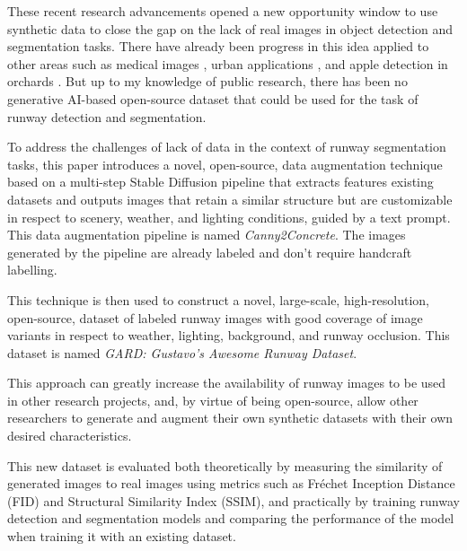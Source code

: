 These recent research advancements opened a new opportunity window to use synthetic data to close the gap on the lack of real images in object detection and segmentation tasks. There have already been progress in this idea applied to other areas such as medical images \cite{saragih_using_2024}, urban applications \cite{reutov_generating_2023}, and apple detection in orchards \cite{voetman_big_2023}. But up to my knowledge of public research, there has been no generative AI-based open-source dataset that could be used for the task of runway detection and segmentation.

To address the challenges of lack of data in the context of runway segmentation tasks, this paper introduces a novel, open-source, data augmentation technique based on a multi-step Stable Diffusion pipeline that extracts features existing datasets and outputs images that retain a similar structure but are customizable in respect to scenery, weather, and lighting conditions, guided by a text prompt. This data augmentation pipeline is named \emph{Canny2Concrete}. The images generated by the pipeline are already labeled and don't require handcraft labelling.

This technique is then used to construct a novel, large-scale, high-resolution, open-source, dataset of labeled runway images with good coverage of image variants in respect to weather, lighting, background, and runway occlusion. This dataset is named \emph{GARD: Gustavo's Awesome Runway Dataset}.

This approach can greatly increase the availability of runway images to be used in other research projects, and, by virtue of being open-source, allow other researchers to generate and augment their own synthetic datasets with their own desired characteristics.

This new dataset is evaluated both theoretically by measuring the similarity of generated images to real images using metrics such as Fréchet Inception Distance (FID) and Structural Similarity Index (SSIM), and practically by training runway detection and segmentation models and comparing the performance of the model when training it with an existing dataset.
